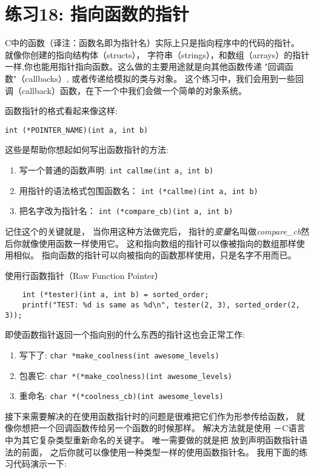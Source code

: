 \chapter{练习18: 指向函数的指针}

C中的函数（译注：函数名即为指针名）实际上只是指向程序中的代码的指针。 就像你创建的指向结构体（structs）， 字符串（strings），和数组（arrays）的指针一样,你也能用指针指向函数。这么做的主要用途就是向其他函数传递
"回调函数"（callbacks）, 或者传递给模拟的类与对象。 这个练习中，我们会用到一些回调（callback）函数，在下一个中我们会做一个简单的对象系统。

函数指针的格式看起来像这样:

\verb|int (*POINTER_NAME)(int a, int b)|

这些是帮助你想起如何写出函数指针的方法:

\begin{enumerate}
\item 写一个普通的函数声明: \verb|int callme(int a, int b)|
\item 用指针的语法格式包围函数名： \verb|int (*callme)(int a, int b)|
\item 把名字改为指针名： \verb|int (*compare_cb)(int a, int b)|
\end{enumerate}

记住这个的关键就是， 当你用这种方法做完后， 指针的\emph{变量}名叫做\emph{compare\_cb}然后你就像使用函数一样使用它。  这和指向数组的指针可以像被指向的数组那样使用相似。 指向函数的指针可以向被指向的函数那样使用，只是名字不用而已。

\begin{code}{使用行函数指针（Raw Function Pointer）}
\begin{lstlisting}
    int (*tester)(int a, int b) = sorted_order;
    printf("TEST: %d is same as %d\n", tester(2, 3), sorted_order(2, 3)); 
\end{lstlisting}
\end{code}

即使函数指针返回一个指向别的什么东西的指针这也会正常工作:

\begin{enumerate}
\item 写下了: \verb|char *make_coolness(int awesome_levels)|
\item 包裹它: \verb|char *(*make_coolness)(int awesome_levels)|
\item 重命名: \verb|char *(*coolness_cb)(int awesome_levels)|
\end{enumerate}

接下来需要解决的在使用函数指针时的问题是很难把它们作为形参传给函数， 就像你想把一个回调函数传给另一个函数的时候那样。 解决方法就是使用 －C语言中为其它复杂类型重新命名的关键字。
唯一需要做的就是把  放到声明函数指针语法的前面， 之后你就可以像使用一种类型一样的使用函数指针名。 我用下面的练习代码演示一下:

